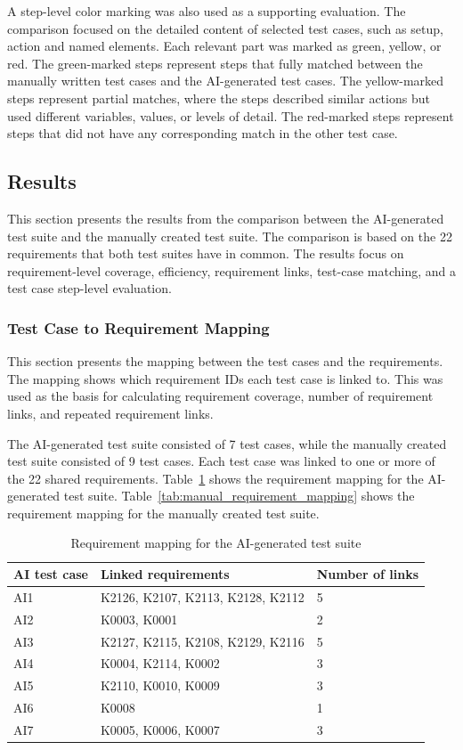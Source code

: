 \documentclass[a4paper,12pt]{article}
\begin{document}
A step-level color marking was also used as a supporting evaluation. The comparison focused on the detailed content of selected test cases, such as setup, action and named elements. Each relevant part was marked as green, yellow, or red. The green-marked steps represent steps that fully matched between the manually written test cases and the AI-generated test cases. The yellow-marked steps represent partial matches, where the steps described similar actions but used different variables, values, or levels of detail. The red-marked steps represent steps that did not have any corresponding match in the other test case.


\subsection{Results}
This section presents the results from the comparison between the AI-generated test suite and the manually created test suite. The comparison is based on the 22 requirements that both test suites have in common. The results focus on requirement-level coverage, efficiency, requirement links, test-case matching, and a test case step-level evaluation. 

\subsubsection{Test Case to Requirement Mapping}
This section presents the mapping between the test cases and the requirements. The mapping shows which requirement IDs each test case is linked to. This was used as the basis for calculating requirement coverage, number of requirement links, and repeated requirement links.

The AI-generated test suite consisted of 7 test cases, while the manually created test suite consisted of 9 test cases. Each test case was linked to one or more of the 22 shared requirements. Table~\ref{tab:ai_requirement_mapping} shows the requirement mapping for the AI-generated test suite. Table~\ref{tab:manual_requirement_mapping} shows the requirement mapping for the manually created test suite.
\begin{table}[H]
\centering
\caption{Requirement mapping for the AI-generated test suite}
\label{tab:ai_requirement_mapping}
\begin{tabular}{p{2.5cm} p{9cm} p{2cm}}
\toprule
\textbf{AI test case} & \textbf{Linked requirements} & \textbf{Number of links} \\
\midrule
AI1 & K2126, K2107, K2113, K2128, K2112 & 5 \\
AI2 & K0003, K0001 & 2 \\
AI3 & K2127, K2115, K2108, K2129, K2116 & 5 \\
AI4 & K0004, K2114, K0002 & 3 \\
AI5 & K2110, K0010, K0009 & 3 \\
AI6 & K0008 & 1 \\
AI7 & K0005, K0006, K0007 & 3 \\
\bottomrule
\end{tabular}
\end{table}
\end{document}
